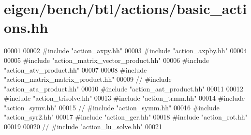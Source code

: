 \hypertarget{eigen_2bench_2btl_2actions_2basic__actions_8hh_source}{}\section{eigen/bench/btl/actions/basic\+\_\+actions.hh}
\label{eigen_2bench_2btl_2actions_2basic__actions_8hh_source}

\begin{DoxyCode}
00001 
00002 \textcolor{preprocessor}{#include "action\_axpy.hh"}
00003 \textcolor{preprocessor}{#include "action\_axpby.hh"}
00004 
00005 \textcolor{preprocessor}{#include "action\_matrix\_vector\_product.hh"}
00006 \textcolor{preprocessor}{#include "action\_atv\_product.hh"}
00007 
00008 \textcolor{preprocessor}{#include "action\_matrix\_matrix\_product.hh"}
00009 \textcolor{comment}{// #include "action\_ata\_product.hh"}
00010 \textcolor{preprocessor}{#include "action\_aat\_product.hh"}
00011 
00012 \textcolor{preprocessor}{#include "action\_trisolve.hh"}
00013 \textcolor{preprocessor}{#include "action\_trmm.hh"}
00014 \textcolor{preprocessor}{#include "action\_symv.hh"}
00015 \textcolor{comment}{// #include "action\_symm.hh"}
00016 \textcolor{preprocessor}{#include "action\_syr2.hh"}
00017 \textcolor{preprocessor}{#include "action\_ger.hh"}
00018 \textcolor{preprocessor}{#include "action\_rot.hh"}
00019 
00020 \textcolor{comment}{// #include "action\_lu\_solve.hh"}
00021 
\end{DoxyCode}
